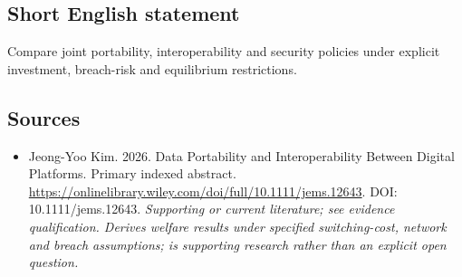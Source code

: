 \documentclass[11pt]{article}
\begin{document}
\subsection{Short English statement}
Compare joint portability, interoperability and security policies under explicit investment, breach-risk and equilibrium restrictions.

\subsection{Sources}
\begin{itemize}\raggedright
\item[\textnormal{[S1]}]\hypertarget{source:30007691:1}{} Jeong-Yoo Kim. 2026. Data Portability and Interoperability Between Digital Platforms. Primary indexed abstract.
\url{https://onlinelibrary.wiley.com/doi/full/10.1111/jems.12643}.
DOI: 10.1111/jems.12643.
{\small\textit{Supporting or current literature; see evidence qualification. Derives welfare results under specified switching-cost, network and breach assumptions; is supporting research rather than an explicit open question.}}
\end{itemize}
\end{document}
